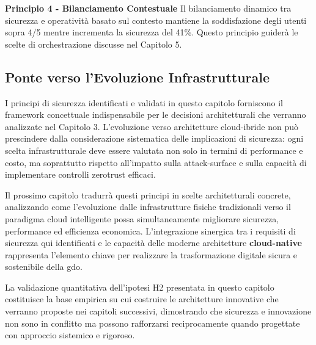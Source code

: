 \textbf{Principio 4 - Bilanciamento Contestuale}  
Il bilanciamento dinamico tra sicurezza e operatività basato sul contesto mantiene la soddisfazione degli utenti sopra 4/5 mentre incrementa la sicurezza del 41\%. Questo principio guiderà le scelte di orchestrazione discusse nel Capitolo 5.

\subsection{\texorpdfstring{Ponte verso l'Evoluzione Infrastrutturale}{2.7.3 - Ponte verso l'Evoluzione Infrastrutturale}}

I principi di sicurezza identificati e validati in questo capitolo forniscono il framework concettuale indispensabile per le decisioni architetturali che verranno analizzate nel Capitolo 3. L'evoluzione verso architetture cloud-ibride non può prescindere dalla considerazione sistematica delle implicazioni di sicurezza: ogni scelta infrastrutturale deve essere valutata non solo in termini di performance e costo, ma soprattutto rispetto all'impatto sulla \gls{attack-surface} e sulla capacità di implementare controlli \gls{zerotrust} efficaci.

Il prossimo capitolo tradurrà questi principi in scelte architetturali concrete, analizzando come l'evoluzione dalle infrastrutture fisiche tradizionali verso il paradigma cloud intelligente possa simultaneamente migliorare sicurezza, performance ed efficienza economica. L'integrazione sinergica tra i requisiti di sicurezza qui identificati e le capacità delle moderne architetture \textbf{\gls{cloud-native}} rappresenta l'elemento chiave per realizzare la trasformazione digitale sicura e sostenibile della \gls{gdo}.

La validazione quantitativa dell'ipotesi H2 presentata in questo capitolo costituisce la base empirica su cui costruire le architetture innovative che verranno proposte nei capitoli successivi, dimostrando che sicurezza e innovazione non sono in conflitto ma possono rafforzarsi reciprocamente quando progettate con approccio sistemico e rigoroso.


